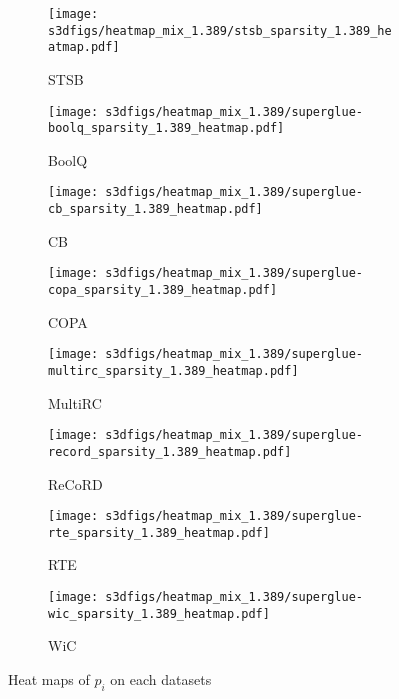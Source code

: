 \begin{figure}[!htbp]
  \begin{subfigure}[t]{0.49\textwidth}
    \texttt{[image: s3dfigs/heatmap\_mix\_1.389/stsb\_sparsity\_1.389\_heatmap.pdf]}
    \vspace{-0.45cm}
    \caption{STSB}
  \end{subfigure}
  \begin{subfigure}[t]{0.49\textwidth}
    \texttt{[image: s3dfigs/heatmap\_mix\_1.389/superglue-boolq\_sparsity\_1.389\_heatmap.pdf]}
    \vspace{-0.45cm}
    \caption{BoolQ}
  \end{subfigure}
  \quad
  
  \begin{subfigure}[t]{0.49\textwidth}
    \texttt{[image: s3dfigs/heatmap\_mix\_1.389/superglue-cb\_sparsity\_1.389\_heatmap.pdf]}
    \vspace{-0.45cm}
    \caption{CB}
  \end{subfigure}
  \begin{subfigure}[t]{0.49\textwidth}
    \texttt{[image: s3dfigs/heatmap\_mix\_1.389/superglue-copa\_sparsity\_1.389\_heatmap.pdf]}
    \vspace{-0.45cm}
    \caption{COPA}
  \end{subfigure}
  \quad
  
  \begin{subfigure}[t]{0.49\textwidth}
    \texttt{[image: s3dfigs/heatmap\_mix\_1.389/superglue-multirc\_sparsity\_1.389\_heatmap.pdf]}
    \vspace{-0.45cm}
    \caption{MultiRC}
  \end{subfigure}
  \begin{subfigure}[t]{0.49\textwidth}
    \texttt{[image: s3dfigs/heatmap\_mix\_1.389/superglue-record\_sparsity\_1.389\_heatmap.pdf]}
    \vspace{-0.45cm}
    \caption{ReCoRD}
  \end{subfigure}
  \quad
  
  \begin{subfigure}[t]{0.49\textwidth}
    \texttt{[image: s3dfigs/heatmap\_mix\_1.389/superglue-rte\_sparsity\_1.389\_heatmap.pdf]}
    \vspace{-0.45cm}
    \caption{RTE}
  \end{subfigure}
  \begin{subfigure}[t]{0.49\textwidth}
    \texttt{[image: s3dfigs/heatmap\_mix\_1.389/superglue-wic\_sparsity\_1.389\_heatmap.pdf]}
    \vspace{-0.45cm}
    \caption{WiC}
  \end{subfigure}
  \quad
  \vspace{-0.3cm}
    \caption{Heat maps of $p_i$ on each datasets}\label{app:table:all_heatmaps}
\end{figure}